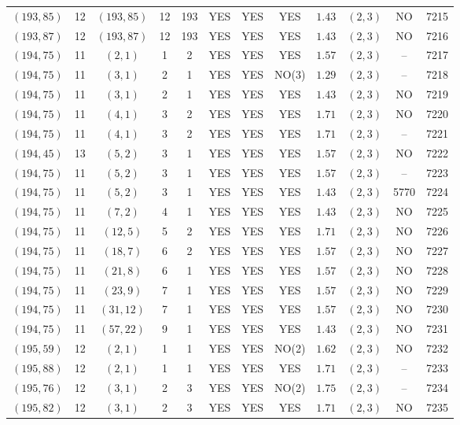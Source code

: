 \begin{longtable}{|c|c|c|c|c|c|c|c|c|c|c|c|}
$(193,85)$ & 12 & $(193,85)$ & 12 & 193 & YES & YES & YES & $1.43$ & $(2,3)$ & NO & 7215\\
$(193,87)$ & 12 & $(193,87)$ & 12 & 193 & YES & YES & YES & $1.43$ & $(2,3)$ & NO & 7216\\
$(194,75)$ & 11 & $(2,1)$ & 1 & 2 & YES & YES & YES & $1.57$ & $(2,3)$ & -- & 7217\\
$(194,75)$ & 11 & $(3,1)$ & 2 & 1 & YES & YES & NO(3) & $1.29$ & $(2,3)$ & -- & 7218\\
$(194,75)$ & 11 & $(3,1)$ & 2 & 1 & YES & YES & YES & $1.43$ & $(2,3)$ & NO & 7219\\
$(194,75)$ & 11 & $(4,1)$ & 3 & 2 & YES & YES & YES & $1.71$ & $(2,3)$ & NO & 7220\\
$(194,75)$ & 11 & $(4,1)$ & 3 & 2 & YES & YES & YES & $1.71$ & $(2,3)$ & -- & 7221\\
$(194,45)$ & 13 & $(5,2)$ & 3 & 1 & YES & YES & YES & $1.57$ & $(2,3)$ & NO & 7222\\
$(194,75)$ & 11 & $(5,2)$ & 3 & 1 & YES & YES & YES & $1.57$ & $(2,3)$ & -- & 7223\\
$(194,75)$ & 11 & $(5,2)$ & 3 & 1 & YES & YES & YES & $1.43$ & $(2,3)$ & 5770 & 7224\\
$(194,75)$ & 11 & $(7,2)$ & 4 & 1 & YES & YES & YES & $1.43$ & $(2,3)$ & NO & 7225\\
$(194,75)$ & 11 & $(12,5)$ & 5 & 2 & YES & YES & YES & $1.71$ & $(2,3)$ & NO & 7226\\
$(194,75)$ & 11 & $(18,7)$ & 6 & 2 & YES & YES & YES & $1.57$ & $(2,3)$ & NO & 7227\\
$(194,75)$ & 11 & $(21,8)$ & 6 & 1 & YES & YES & YES & $1.57$ & $(2,3)$ & NO & 7228\\
$(194,75)$ & 11 & $(23,9)$ & 7 & 1 & YES & YES & YES & $1.57$ & $(2,3)$ & NO & 7229\\
$(194,75)$ & 11 & $(31,12)$ & 7 & 1 & YES & YES & YES & $1.57$ & $(2,3)$ & NO & 7230\\
$(194,75)$ & 11 & $(57,22)$ & 9 & 1 & YES & YES & YES & $1.43$ & $(2,3)$ & NO & 7231\\
$(195,59)$ & 12 & $(2,1)$ & 1 & 1 & YES & YES & NO(2) & $1.62$ & $(2,3)$ & NO & 7232\\
$(195,88)$ & 12 & $(2,1)$ & 1 & 1 & YES & YES & YES & $1.71$ & $(2,3)$ & -- & 7233\\
$(195,76)$ & 12 & $(3,1)$ & 2 & 3 & YES & YES & NO(2) & $1.75$ & $(2,3)$ & -- & 7234\\
$(195,82)$ & 12 & $(3,1)$ & 2 & 3 & YES & YES & YES & $1.71$ & $(2,3)$ & NO & 7235\\

\end{longtable}
